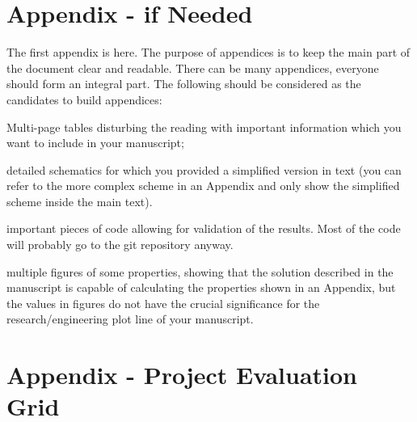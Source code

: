 \cleardoublepage%
%
\chapter[Appendix A - If Needed]{\label{chap:apx_exp_data}Appendix  - if Needed}%
%
  
The first appendix is here. The purpose of appendices is to keep the main part of the document clear and readable. There can be many appendices, everyone should form an integral part. The following should be considered as the candidates to build appendices:

\begin{tight_itemize}
    \item Multi-page tables disturbing the reading with important information which you want to include in your manuscript;
    \item detailed schematics for which you provided a simplified version in text (you can refer to the more complex scheme in an Appendix and only show the simplified scheme inside the main text).
    \item important pieces of code allowing for validation of the results. Most of the code will probably go to the git repository anyway.
    \item multiple figures of some properties, showing that the solution described in the manuscript is capable of calculating the properties shown in an Appendix, but the values in figures do not have the crucial significance for the research/engineering plot line of your manuscript.
\end{tight_itemize}

\chapter[Appendix - Project Evaluation Grid ]{\label{chap:apx_b}Appendix  - Project Evaluation Grid}%
%
  
